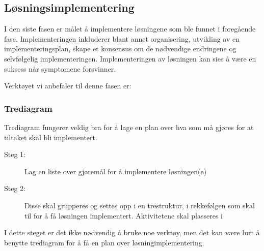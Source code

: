 \subsection{Løsningsimplementering}
I den siste fasen er målet å implementere løsningene som ble funnet i foregående fase. Implementeringen inkluderer blant annet organisering, utvikling av en implementeringsplan, skape et konsensus om de nødvendige endringene og selvfølgelig implementeringen. Implementeringen av løsningen kan sies å være en suksess når symptomene forsvinner. 

Verktøyet vi anbefaler til denne fasen er:

\subsubsection{Trediagram}
Trediagram fungerer veldig bra for å lage en plan over hva som må gjøres for at tiltaket skal bli implementert. 
\begin{description}
    \item[Steg 1:] Lag en liste over gjøremål for å implementere løsningen(e)
    \item[Steg 2:] Disse skal grupperes og settes opp i en trestruktur, i rekkefølgen som skal til for å få løsningen implementert. Aktivitetene skal plasseres i 
\end{description}

I dette steget er det ikke nødvendig å bruke noe verktøy, men det kan være lurt å benytte trediagram for å få en plan over løsningimplementering.

